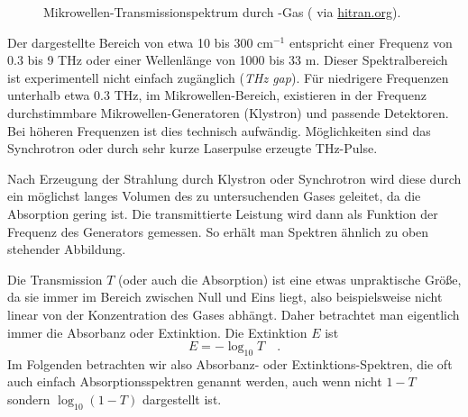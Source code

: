 \begin{figure}
\caption{Mikrowellen-Transmissionspektrum durch  -Gas  (\cite{Li_2011_hcl} via \href{https://hitran.org}{hitran.org}).
\label{fig:rot_hcl}}
\end{figure}




Der dargestellte Bereich  von etwa 10 bis 300 cm$^{-1}$ entspricht einer Frequenz von 0.3 bis 9 THz oder einer Wellenlänge von 1000 bis 33 \textmu m. Dieser Spektralbereich ist experimentell nicht einfach zugänglich (\emph{THz gap}). Für niedrigere Frequenzen unterhalb etwa 0.3 THz, im Mikrowellen-Bereich, existieren in der Frequenz durchstimmbare  Mikrowellen-Generatoren (Klystron) und passende Detektoren. Bei höheren Frequenzen ist dies technisch aufwändig. Möglichkeiten sind das Synchrotron oder durch sehr kurze Laserpulse erzeugte THz-Pulse.

Nach Erzeugung der Strahlung durch Klystron oder Synchrotron wird diese durch ein möglichst langes Volumen des zu untersuchenden Gases geleitet, da die Absorption gering ist. Die transmittierte Leistung wird dann als Funktion der Frequenz des Generators gemessen. So erhält man  Spektren ähnlich zu oben stehender Abbildung.

Die Transmission $T$ (oder auch die Absorption) ist eine etwas unpraktische Größe, da sie immer im Bereich zwischen Null und Eins liegt, also beispielsweise nicht linear von der Konzentration des Gases abhängt. Daher betrachtet man eigentlich immer die Absorbanz oder Extinktion. Die Extinktion $E$ ist
%
\begin{equation}
 E = - \log_{10} T \quad .
\end{equation}
%
Im Folgenden betrachten wir also Absorbanz- oder Extinktions-Spektren, die oft auch einfach Absorptionsspektren genannt werden, auch wenn nicht $1-T$ sondern $\log_{10} ( 1- T)$ dargestellt ist.

\begin{marginfigure}
\caption{Das HCl-Spektrum aus Abbildung \ref{fig:rot_hcl} als Extinktionsspektrum.}
\end{marginfigure}




